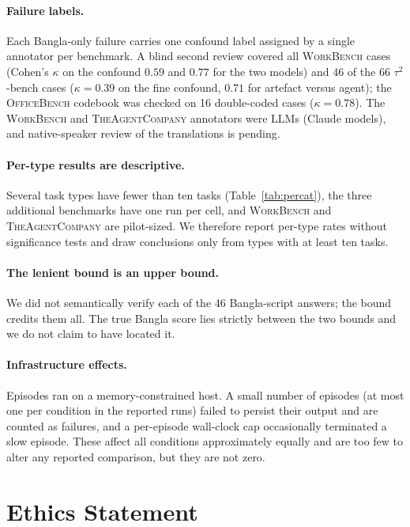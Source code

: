 \documentclass[11pt]{article}
\begin{document}
\paragraph{Failure labels.} Each Bangla-only failure carries one confound label assigned by a
single annotator per benchmark. A blind second review covered all \textsc{WorkBench} cases (Cohen's
$\kappa$ on the confound $0.59$ and $0.77$ for the two models) and 46 of the 66 $\tau^2$-bench
cases ($\kappa=0.39$ on the fine confound, $0.71$ for artefact versus agent); the
\textsc{OfficeBench} codebook was checked on 16 double-coded cases ($\kappa=0.78$). The
\textsc{WorkBench} and \textsc{TheAgentCompany} annotators were LLMs (Claude models), and
native-speaker review of the translations is pending.

\paragraph{Per-type results are descriptive.} Several task types have fewer than ten tasks
(Table~\ref{tab:percat}), the three additional benchmarks have one run per cell, and
\textsc{WorkBench} and \textsc{TheAgentCompany} are pilot-sized. We therefore report per-type
rates without significance tests and draw conclusions only from types with at least ten tasks.

\paragraph{The lenient bound is an upper bound.} We did not semantically verify each of the 46
Bangla-script answers; the bound credits them all. The true Bangla score lies strictly between
the two bounds and we do not claim to have located it.

\paragraph{Infrastructure effects.} Episodes ran on a memory-constrained host. A small number of
episodes (at most one per condition in the reported runs) failed to persist their output and are
counted as failures, and a per-episode wall-clock cap occasionally terminated a slow episode.
These affect all conditions approximately equally and are too few to alter any reported
comparison, but they are not zero.

\section*{Ethics Statement}
\end{document}
